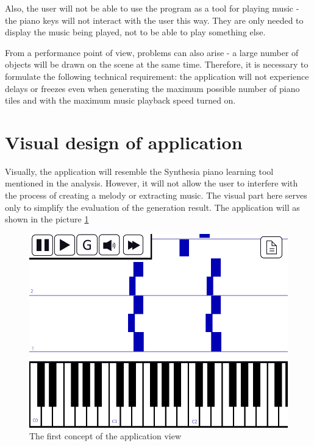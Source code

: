 \documentclass[thesis=B,english]{FITthesis}[2019/12/23]
\begin{document}
Also, the user will not be able to use the program as a tool for playing music - the piano keys will not interact with the user this way. They are only needed to display the music being played, not to be able to play something else.

From a performance point of view, problems can also arise - a large number of objects will be drawn on the scene at the same time. Therefore, it is necessary to formulate the following technical requirement: the application will not experience delays or freezes even when generating the maximum possible number of piano tiles and with the maximum music playback speed turned on.

\section{Visual design of application}

Visually, the application will resemble the Synthesia piano learning tool mentioned in the analysis. However, it will not allow the user to interfere with the process of creating a melody or extracting music. The visual part here serves only to simplify the evaluation of the generation result. The application will as shown in the picture \figurename \ref{fig:PianoDesign17}

\begin{figure}[ht]
            \includegraphics[width=\textwidth]{PianoDesign17.png}
            \caption{The first concept of the application view}
            \label{fig:PianoDesign17}
\end{figure}
\end{document}
